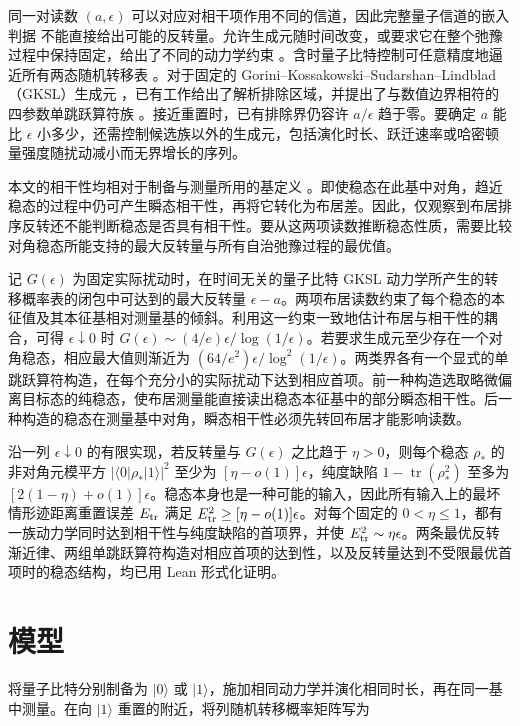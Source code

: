 \documentclass[aps,pra,reprint,amsmath,amssymb,nofootinbib,floatfix,longbibliography]{revtex4-2}
\theoremstyle{aps}
\DeclareMathOperator{\tr}{tr}
\newcommand{\eps}{\epsilon}
\newcommand{\ket}[1]{|#1\rangle}
\newcommand{\bra}[1]{\langle#1|}
\begin{document}
同一对读数 $(a,\eps)$ 可以对应对相干项作用不同的信道，因此完整量子信道的嵌入判据 \cite{WolfEisert2008} 不能直接给出可能的反转量。允许生成元随时间改变，或要求它在整个弛豫过程中保持固定，给出了不同的动力学约束 \cite{WolfCirac2008,Davalos2019}。含时量子比特控制可任意精度地逼近所有两态随机转移表 \cite{KorzekwaLostaglio2021}。对于固定的 Gorini--\allowbreak Kossakowski--\allowbreak Sudarshan--\allowbreak Lindblad（GKSL）生成元 \cite{GKS1976,Lindblad1976}，已有工作给出了解析排除区域，并提出了与数值边界相符的四参数单跳跃算符族 \cite{Shahbeigi2024}。接近重置时，已有排除界仍容许 $a/\eps$ 趋于零。要确定 $a$ 能比 $\eps$ 小多少，还需控制候选族以外的生成元，包括演化时长、跃迁速率或哈密顿量强度随扰动减小而无界增长的序列。

本文的相干性均相对于制备与测量所用的基定义 \cite{Streltsov2017}。即使稳态在此基中对角，趋近稳态的过程中仍可产生瞬态相干性，再将它转化为布居差。因此，仅观察到布居排序反转还不能判断稳态是否具有相干性。要从这两项读数推断稳态性质，需要比较对角稳态所能支持的最大反转量与所有自治弛豫过程的最优值。

记 $G(\eps)$ 为固定实际扰动时，在时间无关的量子比特 GKSL 动力学所产生的转移概率表的闭包中可达到的最大反转量 $\eps-a$。两项布居读数约束了每个稳态的本征值及其本征基相对测量基的倾斜。利用这一约束一致地估计布居与相干性的耦合，可得 $\eps\downarrow0$ 时 $G(\eps)\sim(4/e)\eps/\log(1/\eps)$。若要求生成元至少存在一个对角稳态，相应最大值则渐近为 $(64/e^2)\eps/\log^2(1/\eps)$。两类界各有一个显式的单跳跃算符构造，在每个充分小的实际扰动下达到相应首项。前一种构造选取略微偏离目标态的纯稳态，使布居测量能直接读出稳态本征基中的部分瞬态相干性。后一种构造的稳态在测量基中对角，瞬态相干性必须先转回布居才能影响读数。

沿一列 $\eps\downarrow0$ 的有限实现，若反转量与 $G(\eps)$ 之比趋于 $\eta>0$，则每个稳态 $\rho_*$ 的非对角元模平方 $|\bra0\rho_*\ket1|^2$ 至少为 $[\eta-o(1)]\eps$，纯度缺陷 $1-\tr(\rho_*^2)$ 至多为 $[2(1-\eta)+o(1)]\eps$。稳态本身也是一种可能的输入，因此所有输入上的最坏情形迹距离重置误差 $E_{\rm tr}$ 满足 $E_{\rm tr}^2\ge[\eta-o(1)]\eps$。对每个固定的 $0<\eta\le1$，都有一族动力学同时达到相干性与纯度缺陷的首项界，并使 $E_{\rm tr}^2\sim\eta\eps$。两条最优反转渐近律、两组单跳跃算符构造对相应首项的达到性，以及反转量达到不受限最优首项时的稳态结构，均已用 Lean 形式化证明。

\section{模型}\label{sec:model}

将量子比特分别制备为 $\ket0$ 或 $\ket1$，施加相同动力学并演化相同时长，再在同一基中测量。在向 $\ket1$ 重置的附近，将列随机转移概率矩阵写为
\end{document}
